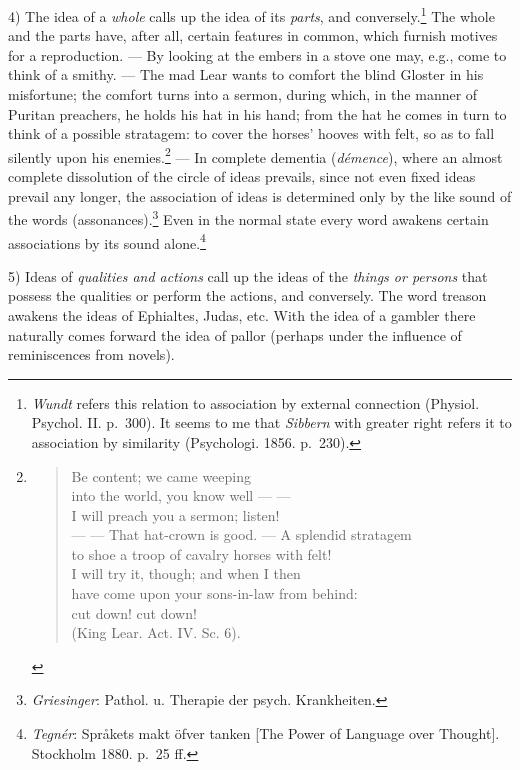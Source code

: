 \documentclass[12pt,a4paper]{book}
\newcommand{\opage}[1]{\marginnote{\footnotesize\textit{[#1]}}}
\begin{document}
4) The idea of a \emph{whole} calls up the idea of its
\emph{parts}, and conversely.\footnote{\emph{Wundt} refers this
relation to association by external connection (Physiol. Psychol. II.
p.~300). It seems to me that \emph{Sibbern} with greater right refers it
to association by similarity (Psychologi. 1856. p.~230).} The whole and
the parts have, after all, certain features in common, which furnish
motives for a reproduction. --- By looking at the embers in a stove one
may, e.g., come to think of a smithy. --- The mad Lear wants to comfort
the blind Gloster in his misfortune; the comfort turns into a sermon,
during which, in the manner of Puritan preachers, he holds his hat in
his hand; from the hat he comes in turn to think of a possible
stratagem: to cover the horses' hooves with felt, so as to fall silently
upon his
enemies.\footnote{%
\begin{verse}
Be content; we came weeping\\
into the world, you know well --- ---\\
I will preach you a sermon; listen!\\
--- --- That hat-crown is good. --- A splendid stratagem\\
to shoe a troop of cavalry horses with felt!\\
I will try it, though; and when I then\\
have come upon your sons-in-law from behind:\\
cut down! cut down!\\
\hspace*{\fill}(King Lear. Act. IV. Sc. 6).
\end{verse}} --- In complete dementia (\textit{démence}), where an
almost complete dissolution of the circle of ideas prevails, since not
even fixed ideas prevail any longer, the association of ideas is
determined only by the like sound of the words
(assonances).\footnote{\emph{Griesinger}: Pathol. u. Therapie der
psych. Krankheiten.} Even in the normal state every word awakens certain
associations by its sound alone.\footnote{\emph{Tegnér}: Språkets
makt öfver tanken [The Power of Language over Thought]. Stockholm 1880.
p.~25 ff.}

5) Ideas of \emph{qualities and actions} call up the ideas of the
\emph{things or persons} that possess the qualities or perform the
actions, and conversely. The word treason awakens the ideas of
Ephialtes, Judas, etc. With the idea of a gambler there naturally comes
forward
\opage{190}the idea of pallor (perhaps under the influence of
reminiscences from novels).
\end{document}
